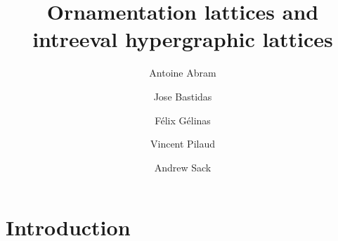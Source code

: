 \documentclass{amsart}
\title[Ornamentation lattices and intreeval hypergraphic lattices]{Ornamentation lattices and \\ intreeval hypergraphic lattices}
\author{Antoine Abram}
\author{Jose Bastidas}
\author{Félix Gélinas}
\author{Vincent Pilaud}
\author{Andrew Sack}
\theoremstyle{definition}
\begin{document}
\begin{abstract}
\end{abstract}

\maketitle

\tableofcontents


\pagebreak

\section{Introduction}
\label{sec:introduction}
\end{document}
